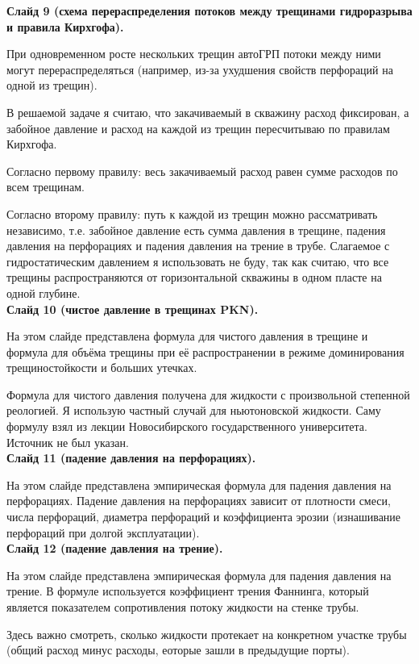 \documentclass[a4paper, 12pt]{article}
\begin{document}
\textbf{Слайд 9 (схема перераспределения потоков между трещинами гидроразрыва и правила Кирхгофа).}

При одновременном росте нескольких трещин автоГРП потоки между ними могут перераспределяться (например, из-за ухудшения свойств перфораций на одной из трещин).

В решаемой задаче я считаю, что закачиваемый в скважину расход фиксирован, а забойное давление и расход на каждой из трещин пересчитываю по правилам Кирхгофа.

Согласно первому правилу: весь закачиваемый расход равен сумме расходов по всем трещинам.

Согласно второму правилу: путь к каждой из трещин можно рассматривать независимо, т.е. забойное давление есть сумма давления в трещине, падения давления на перфорациях и падения давления на трение в трубе.
Слагаемое с гидростатическим давлением я использовать не буду, так как считаю, что все трещины распространяются от горизонтальной скважины в одном пласте на одной глубине.\\

\textbf{Слайд 10 (чистое давление в трещинах PKN).}

На этом слайде представлена формула для чистого давления в трещине и формула для объёма трещины при её распространении в режиме доминирования трещиностойкости и больших утечках.

Формула для чистого давления получена для жидкости с произвольной степенной реологией.
Я использую частный случай для ньютоновской жидкости.
Саму формулу взял из лекции Новосибирского государственного университета.
Источник не был указан.\\

\textbf{Слайд 11 (падение давления на перфорациях).}

На этом слайде представлена эмпирическая формула для падения давления на перфорациях.
Падение давления на перфорациях зависит от плотности смеси, числа перфораций, диаметра перфораций и коэффициента эрозии (изнашивание перфораций при долгой эксплуатации).\\

\textbf{Слайд 12 (падение давления на трение).}

На этом слайде представлена эмпирическая формула для падения давления на трение.
В формуле используется коэффициент трения Фаннинга, который является показателем сопротивления потоку жидкости на стенке трубы.

Здесь важно смотреть, сколько жидкости протекает на конкретном участке трубы (общий расход минус расходы, еоторые зашли в предыдущие порты).\\
\end{document}
